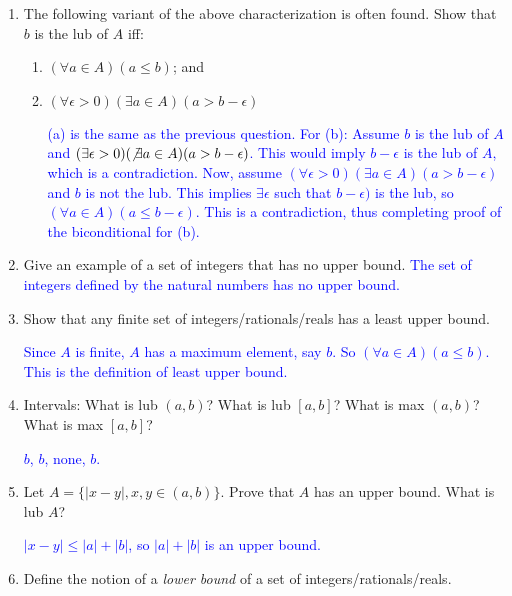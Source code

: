 \documentclass[13.5pt]{article}
\begin{document}
\begin{enumerate}
\begin{enumerate}
\end{enumerate}

\item{The following variant of the above characterization is often found. Show that \(b\) is the lub of \(A\) iff:}

\begin{enumerate}
\setlength{\itemindent}{.1in}
\item{\((\forall a \in A)(a \leq b)\); and}

\item{\((\forall \epsilon > 0)(\exists a \in A)(a > b-\epsilon)\)}

\textcolor{blue} {(a) is the same as the previous question. For (b):}
\textcolor{blue} {Assume \(b\) is the lub of \(A\) and \((\exists \epsilon>0)(\not\exists a \in A)(a>b-\epsilon)\). This would imply \(b-\epsilon\) is the lub of \(A\), which is a contradiction. Now, assume \((\forall \epsilon >0)(\exists a \in A)(a>b-\epsilon)\) and \(b\) is not the lub. This implies \(\exists \epsilon\) such that \(b-\epsilon)\) is the lub, so \((\forall a \in A)(a \leq b-\epsilon)\). This is a contradiction, thus completing proof of the biconditional for (b).}

\end{enumerate}

\item{Give an example of a set of integers that has no upper bound.}
\textcolor{blue} {The set of integers defined by the natural numbers has no upper bound.}

\item{Show that any finite set of integers/rationals/reals has a least upper bound.}

\textcolor{blue} {Since \(A\) is finite, \(A\) has a maximum element, say \(b\). So \((\forall a\in A)(a \leq b)\). This is the definition of least upper bound.}

\item{Intervals: What is lub \((a,b)\)? What is lub \([a,b]\)? What is max \((a,b)\)? What is max \([a,b]\)}?

\textcolor{blue} {\(b\), \(b\), none, \(b\).}

\item{Let \(A=\{|x-y|, x,y \in (a,b)\}\). Prove that \(A\) has an upper bound. What is lub \(A\)?}

\textcolor{blue} {\(|x-y| \leq |a|+|b|\), so \(|a|+|b|\) is an upper bound.}

\item{Define the notion of a \textit{lower bound} of a set of integers/rationals/reals.}


\end{enumerate}
\end{document}
